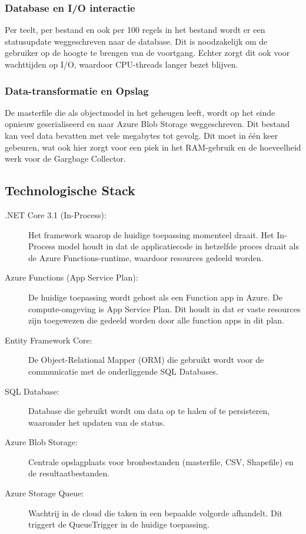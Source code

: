 \subsubsection*{Database en I/O interactie}

Per teelt, per bestand en ook per 100 regels in het bestand wordt er een statusupdate weggeschreven naar de database. Dit is noodzakelijk om de gebruiker op de hoogte te brengen van de voortgang. Echter zorgt dit ook voor wachttijden op I/O, waardoor CPU-threads langer bezet blijven. 

\subsubsection*{Data-transformatie en Opslag}

De masterfile die als objectmodel in het geheugen leeft, wordt op het einde opnieuw geserialiseerd en naar Azure Blob Storage weggeschreven. Dit bestand kan veel data bevatten met vele megabytes tot gevolg. Dit moet in één keer gebeuren, wat ook hier zorgt voor een piek in het RAM-gebruik en de hoeveelheid werk voor de Gargbage Collector.

\subsection{Technologische Stack}

\begin{description}
    \item[.NET Core 3.1 (In-Process):]
    Het framework waarop de huidige toepassing momenteel draait. Het In-Process model houdt in dat de applicatiecode in hetzelfde proces draait als de Azure Functions-runtime, waardoor resources gedeeld worden.
    \item[Azure Functions (App Service Plan):]
    De huidige toepassing wordt gehost als een Function app in Azure. De compute-omgeving is App Service Plan. Dit houdt in dat er vaste resources zijn toegewezen die gedeeld worden door alle function apps in dit plan. 
    \item[Entity Framework Core:]
    De Object-Relational Mapper (ORM) die gebruikt wordt voor de communicatie met de onderliggende SQL Databases.
    \item[SQL Database:]
    Database die gebruikt wordt om data op te halen of te persisteren, waaronder het updaten van de status.
    \item[Azure Blob Storage:]
    Centrale opslagplaats voor bronbestanden (masterfile, CSV, Shapefile) en de resultaatbestanden.
    \item[Azure Storage Queue:]
    Wachtrij in de cloud die taken in een bepaalde volgorde afhandelt. Dit triggert de QueueTrigger in de huidige toepassing.
\end{description}

